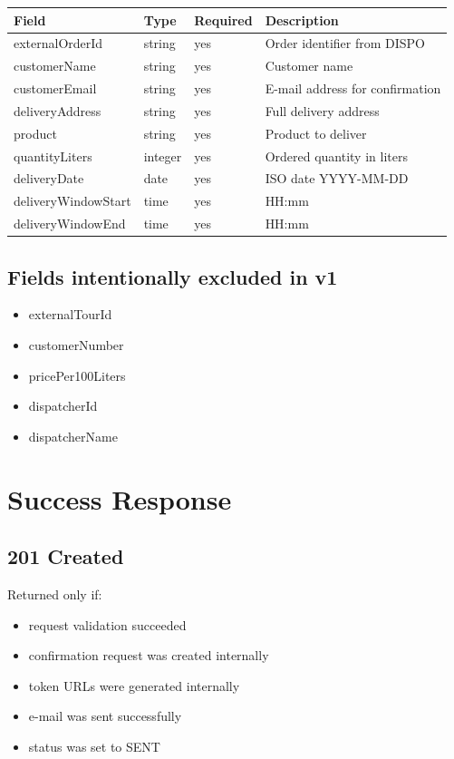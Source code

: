 \documentclass[a4paper,11pt]{article}
\begin{document}
	\begin{longtable}{p{4cm}p{2cm}p{2cm}p{6cm}}
		\toprule
		Field & Type & Required & Description \\
		\midrule
		externalOrderId & string & yes & Order identifier from DISPO \\
		customerName & string & yes & Customer name \\
		customerEmail & string & yes & E-mail address for confirmation \\
		deliveryAddress & string & yes & Full delivery address \\
		product & string & yes & Product to deliver \\
		quantityLiters & integer & yes & Ordered quantity in liters \\
		deliveryDate & date & yes & ISO date YYYY-MM-DD \\
		deliveryWindowStart & time & yes & HH:mm \\
		deliveryWindowEnd & time & yes & HH:mm \\
		\bottomrule
	\end{longtable}
	
	\subsection{Fields intentionally excluded in v1}
	
	\begin{itemize}
		\item externalTourId
		\item customerNumber
		\item pricePer100Liters
		\item dispatcherId
		\item dispatcherName
	\end{itemize}
	
\section{Success Response}

\subsection{201 Created}

Returned only if:

\begin{itemize}
	\item request validation succeeded
	\item confirmation request was created internally
	\item token URLs were generated internally
	\item e-mail was sent successfully
	\item status was set to SENT
\end{itemize}
\end{document}
